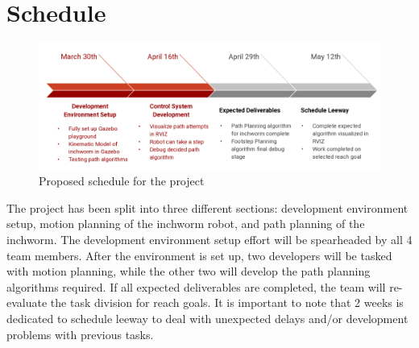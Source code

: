 \section{Schedule}

\begin{figure}[ht]
    \includegraphics[width=\linewidth]{figures/Schedule.png}
    \caption{Proposed schedule for the project}
    \label{fig:Schedule}
\end{figure} 

The project has been split into three different sections: development environment setup, motion planning of the inchworm robot, and path planning of the inchworm. The development environment setup effort will be spearheaded by all 4 team members. After the environment is set up, two developers will be tasked with motion planning, while the other two will develop the path planning algorithms required. If all expected deliverables are completed, the team will re-evaluate the task division for reach goals. It is important to note that 2 weeks is dedicated to schedule leeway to deal with unexpected delays and/or development problems with previous tasks.